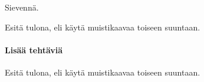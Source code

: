 \begin{tehtavasivu}
\begin{tehtava}
    Sievennä.
    \begin{alakohdat}
    \end{alakohdat}
    \begin{vastaus}
        \begin{alakohdat}
        \end{alakohdat}
    \end{vastaus}
\end{tehtava}

\begin{tehtava}
    Esitä tulona, eli käytä muistikaavaa toiseen suuntaan.
    \begin{alakohdat}
    \end{alakohdat}
    \begin{vastaus}
        \begin{alakohdat}
        \end{alakohdat}
    \end{vastaus}
\end{tehtava}

\paragraph*{Lisää tehtäviä}

\begin{tehtava}
    Esitä tulona, eli käytä muistikaavaa toiseen suuntaan.
    \begin{alakohdat}
    \end{alakohdat}
    \begin{vastaus}
        \begin{alakohdat}
        \end{alakohdat}
    \end{vastaus}
\end{tehtava}


\end{tehtavasivu}
